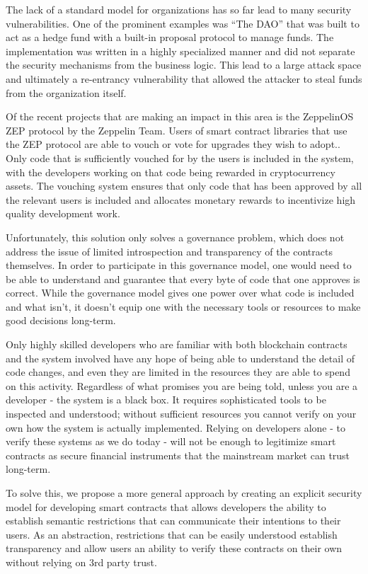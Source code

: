 \documentclass[english,a4paper]{article}
\begin{document}
The lack of a standard model for organizations has so far lead to many
security vulnerabilities. One of the prominent examples was ``The DAO''
that was built to act as a hedge fund with a built-in proposal protocol
to manage funds. The implementation was written in a highly specialized
manner and did not separate the security mechanisms from the business
logic. This lead to a large attack space and ultimately a re-entrancy
vulnerability that allowed the attacker to steal funds from the
organization itself.

Of the recent projects that are making an impact in this area is the
ZeppelinOS ZEP protocol by the Zeppelin Team. Users of smart contract
libraries that use the ZEP protocol are able to vouch or vote for
upgrades they wish to adopt.. Only code that is sufficiently vouched for
by the users is included in the system, with the developers working on
that code being rewarded in cryptocurrency assets. The vouching system
ensures that only code that has been approved by all the relevant users
is included and allocates monetary rewards to incentivize high quality
development work.

Unfortunately, this solution only solves a governance problem, which
does not address the issue of limited introspection and transparency of
the contracts themselves. In order to participate in this governance
model, one would need to be able to understand and guarantee that every
byte of code that one approves is correct. While the governance model
gives one power over what code is included and what isn't, it doesn't
equip one with the necessary tools or resources to make good decisions
long-term.

Only highly skilled developers who are familiar with both blockchain
contracts and the system involved have any hope of being able to
understand the detail of code changes, and even they are limited in the
resources they are able to spend on this activity. Regardless of what
promises you are being told, unless you are a developer - the system is
a black box. It requires sophisticated tools to be inspected and
understood; without sufficient resources you cannot verify on your own
how the system is actually implemented. Relying on developers alone - to
verify these systems as we do today - will not be enough to legitimize
smart contracts as secure financial instruments that the mainstream
market can trust long-term.

To solve this, we propose a more general approach by creating an
explicit security model for developing smart contracts that allows
developers the ability to establish semantic restrictions that can
communicate their intentions to their users. As an abstraction,
restrictions that can be easily understood establish transparency and
allow users an ability to verify these contracts on their own without
relying on 3rd party trust.
\end{document}
